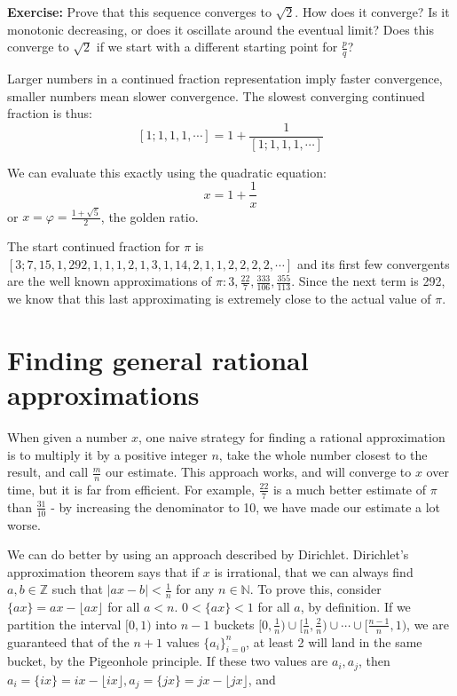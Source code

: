 \documentclass{article}
\begin{document}
\textbf{Exercise:} Prove that this sequence converges to $\sqrt{2}$. How does it converge?
Is it monotonic decreasing, or does it oscillate around the eventual limit? Does this
converge to $\sqrt{2}$ if we start with a different starting point for $\frac{p}{q}$?

Larger numbers in a continued fraction representation imply faster convergence, smaller
numbers mean slower convergence. The slowest converging continued fraction is thus:
\[\left[1;1,1,1,\cdots\right] = 1+\frac{1}{\left[1;1,1,1,\cdots\right]}\]

We can evaluate this exactly using the quadratic equation:
\[ x = 1+\frac{1}{x} \]
or $x = \varphi = \frac{1+\sqrt{5}}{2}$, the golden ratio.

The start continued fraction for $\pi$ is
$\left[3;7,15,1,292,1,1,1,2,1,3,1,14,2,1,1,2,2,2,2,\cdots\right]$ and its first few
convergents are the well known approximations of $\pi: 3, \frac{22}{7}, \frac{333}{106}, \frac{355}{113}$.
Since the next term is 292, we know that this last approximating is extremely close to the actual
value of $\pi$.

\section{Finding general rational approximations}

When given a number $x$, one naive strategy for finding a rational approximation is to multiply
it by a positive integer $n$, take the whole number closest to the result, and call $\frac{m}{n}$ our
estimate. This approach works, and will converge to $x$ over time, but it is far from efficient. For
example, $\frac{22}{7}$ is a much better estimate of $\pi$ than $\frac{31}{10}$ - by increasing the
denominator to 10, we have made our estimate a lot worse.

We can do better by using an approach described by Dirichlet. Dirichlet's approximation theorem
says that if $x$ is irrational, that we can always find $a,b \in \mathbb{Z}$ such that
$|ax-b|<\frac{1}{n}$ for any $n\in \mathbb{N}$. To prove this, consider $\{ax\} = ax - 
\lfloor ax \rfloor$ for all $a < n$. $0<\{ax\}<1$ for all $a$, by definition. If we partition the
interval $[0,1)$ into $n-1$ buckets $[0,\frac{1}{n}) \cup [\frac{1}{n},\frac{2}{n}) \cup \cdots
\cup [\frac{n-1}{n}, 1)$, we are guaranteed that of the $n+1$ values $\{a_i\}_{i=0}^n$, at
least 2 will land in the same bucket, by the Pigeonhole principle. If these two values are $a_i, a_j$,
then $a_i = \{ix\} = ix - \lfloor ix \rfloor, a_j = \{jx\} = jx - \lfloor jx \rfloor$, and
\end{document}
